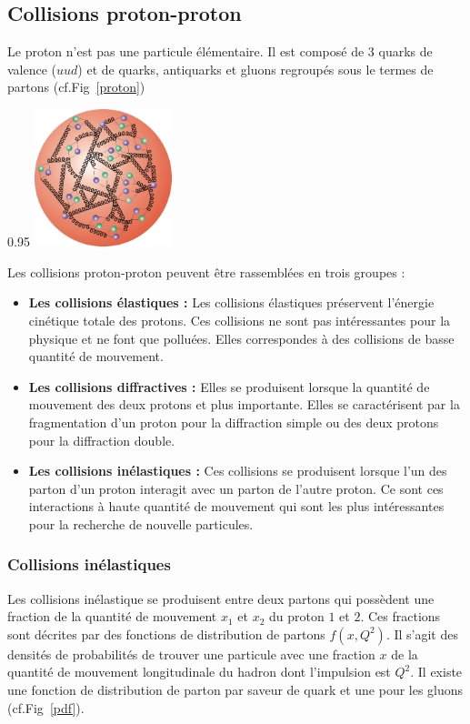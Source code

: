 \subsection{Collisions proton-proton}
Le proton n'est pas une particule élémentaire. Il est composé de \num{3} quarks de valence ($uud$) et de quarks, antiquarks et gluons regroupés sous le termes de partons (cf.Fig~\ref{proton})

\begin{minipagewithmarginpars}[ht!]{0.95\textwidth}
\centering
\includegraphics[width=0.3\textwidth]{SM/quarks3.png}
\label{proton}	
\end{minipagewithmarginpars}

Les collisions proton-proton peuvent être rassemblées en trois groupes :
\begin{itemize}[label=$\bullet$]
	\item \textbf{Les collisions élastiques : } Les collisions élastiques préservent l'énergie cinétique totale des protons. Ces collisions ne sont pas intéressantes pour la physique et ne font que polluées. Elles correspondes à des collisions de basse quantité de mouvement.
	\item\textbf{Les collisions diffractives : } Elles se produisent lorsque la quantité de mouvement des deux protons et plus importante. Elles se caractérisent par la fragmentation d'un proton pour la diffraction simple ou des deux protons pour la diffraction double.
	\item \textbf{Les collisions inélastiques : } Ces collisions se produisent lorsque l'un des parton d'un proton interagit avec un parton de l'autre proton. Ce sont ces interactions à haute quantité de mouvement qui sont les plus intéressantes pour la recherche de nouvelle particules.
\end{itemize}

\subsubsection{Collisions inélastiques}
Les collisions inélastique se produisent entre deux partons qui possèdent une fraction de la quantité de mouvement $x_{1}$ et $x_{2}$ du proton $1$ et $2$. Ces fractions sont décrites par des fonctions de distribution de partons $f(x,Q^{2})$. Il s'agit des densités de probabilités de trouver une particule avec une fraction $x$ de la quantité de mouvement longitudinale du hadron dont l'impulsion est $Q^{2}$. Il existe une fonction de distribution de parton par saveur de quark et une pour les gluons (cf.Fig~\ref{pdf}).

